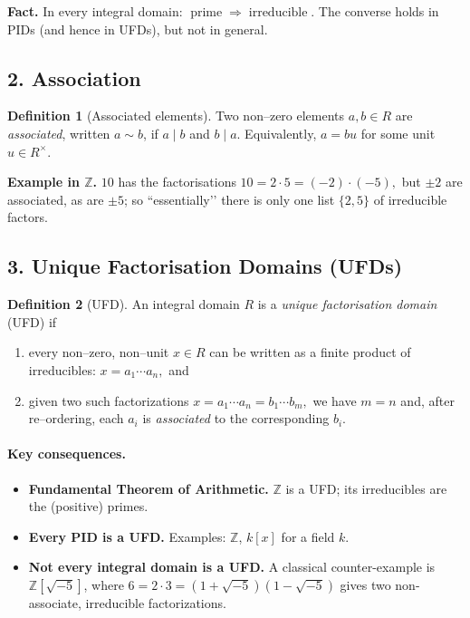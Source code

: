 \documentclass[12pt]{article}
\theoremstyle{definition} %
\newtheorem{definition}{Definition}
\theoremstyle{plain} %
\begin{document}
\textbf{Fact.}  
In every integral domain: \(\text{prime}\;\;\Longrightarrow\;\;\text{irreducible}\).  
The converse holds in PIDs (and hence in UFDs), but not in general.

\medskip

\subsection*{2.  Association}

\begin{definition}[Associated elements]
  Two non–zero elements \(a,b\in R\) are \emph{associated},
  written \(a\sim b\), if \(a\mid b\) and \(b\mid a\).
  Equivalently, \(a=bu\) for some unit \(u\in R^{\times}\).
\end{definition}

\textbf{Example in \(\mathbb Z\).}  
\(10\) has the factorisations
\(
   10 = 2\cdot 5 = (-2)\cdot(-5),
\)
but \(\pm2\) are associated, as are \(\pm5\); so “essentially’’ there is
only one list \(\{2,5\}\) of irreducible factors.

\medskip

\subsection*{3.  Unique Factorisation Domains (UFDs)}

\begin{definition}[UFD]
  An integral domain \(R\) is a \emph{unique factorisation domain}
  (UFD) if
  \begin{enumerate}
    \item every non–zero, non–unit \(x\in R\) can be written as
          a finite product of irreducibles:
          \(
             x = a_{1}\cdots a_{n},
          \)
          and
    \item given two such factorizations
          \(
             x = a_{1}\cdots a_{n} = b_{1}\cdots b_{m},
          \)
          we have \(m=n\) and, after re–ordering, each \(a_{i}\) is
          \emph{associated} to the corresponding \(b_{i}\).
  \end{enumerate}
\end{definition}

\paragraph{Key consequences.}
\begin{itemize}
  \item \textbf{Fundamental Theorem of Arithmetic.}  
        \(\mathbb Z\) is a UFD; its irreducibles are the (positive) primes.
  \item \textbf{Every PID is a UFD.}  
        Examples: \(\mathbb Z\), \(k[x]\) for a field \(k\).
  \item \textbf{Not every integral domain is a UFD.}  
        A classical counter-example is
        \(\mathbb Z[\sqrt{-5}]\), where
        \(
           6 = 2\cdot3 = (1+\sqrt{-5})(1-\sqrt{-5})
        \)
        gives two non-associate, irreducible factorizations.
\end{itemize}
\end{document}
